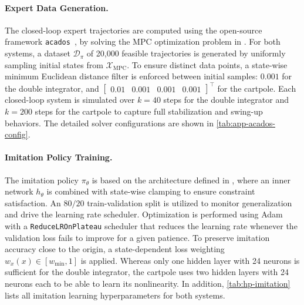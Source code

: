 \paragraph{Expert Data Generation.}
The closed-loop expert trajectories are computed using the open-source framework \texttt{acados}~\cite{verschuerenAcadosModularOpensource2022}, 
by solving the MPC optimization problem in . 
For both systems, a dataset $\mathcal{D}_\pi$ of 20{,}000 feasible trajectories is generated by uniformly sampling 
initial states from $\mathcal{X}_{\mathrm{MPC}}$. 
To ensure distinct data points, a state-wise minimum Euclidean distance filter is enforced between initial samples: 
$0.001$ for the double integrator, and $\begin{bmatrix} 0.01 & 0.001 & 0.001 & 0.001\end{bmatrix}^\top$ for the cartpole. 
Each closed-loop system is simulated over $k = 40$ steps for the double integrator and 
$k = 200$ steps for the cartpole to capture full stabilization and swing-up behaviors. 
The detailed solver configurations are shown in \cref{tab:app-acados-config}.


\paragraph{Imitation Policy Training.}
The imitation policy $\pi_\theta$ is based on the architecture defined in , 
where an inner network $h_\theta$ is combined with state-wise clamping to ensure constraint satisfaction. 
An $80/20$ train-validation split is utilized to monitor generalization and drive the learning rate scheduler. 
Optimization is performed using Adam with a \texttt{ReduceLROnPlateau} scheduler that reduces the learning rate 
whenever the validation loss fails to improve for a given patience. 
To preserve imitation accuracy close to the origin, a state-dependent loss weighting $w_x(x) \in [w_{\min}, 1]$ is applied. 
Whereas only one hidden layer with 24 neurons is sufficient for the double integrator, 
the cartpole uses two hidden layers with 24 neurons each to be able to learn its nonlinearity. 
In addition, \cref{tab:hp-imitation} lists all imitation learning hyperparameters for both systems.

